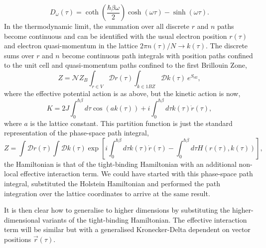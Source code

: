 \begin{equation} \label{eqn:phonongf}
    D_{\omega}(\tau) = \coth(\frac{\hbar\beta\omega}{2}) \cosh(\omega \tau) - \sinh(\omega\tau).
\end{equation}
In the thermodynamic limit, the summation over all discrete $r$ and $n$ paths become continuous and can be identified with the usual electron position $r(\tau)$ and electron quasi-momentum in the lattice $ 
2\pi n(\tau) / N \rightarrow k(\tau)$. The discrete sums over $r$ and $n$ become continuous path integrals with position paths confined to the unit cell and quasi-momentum paths confined to the first Brillouin Zone,
\begin{equation}
    Z = \mathcal{N} Z_B \int_{r \in V} \mathcal{D}r(\tau) \int_{k \in 1BZ} \mathcal{D} k(\tau)\ e^{S_{\text{eff}}} ,
\end{equation}
where the effective potential action is as above, but the kinetic action is now,
\begin{equation}
    K = 2 J \int_0^{\hbar\beta} d\tau \cos{(a k(\tau))} + i \int_0^{\hbar\beta} d\tau k(\tau) \Dot{r}(\tau) ,
\end{equation}
where $a$ is the lattice constant. This partition function is just the standard representation of the phase-space path integral,
\begin{equation}
    Z = \int \mathcal{D}r(\tau) \int \mathcal{D}k(\tau) \exp \left[i \int_0^{\hbar\beta} d\tau k(\tau) \Dot{r}(\tau) - \int_0^{\hbar\beta} d\tau H(r(\tau), k(\tau)) \right] ,
\end{equation}
the Hamiltonian is that of the tight-binding Hamiltonian with an additional non-local effective interaction term. We could have started with this phase-space path integral, substituted the Holstein Hamiltonian and performed the path integration over the lattice coordinates to arrive at the same result. 

It is then clear how to generalise to higher dimensions by substituting the higher-dimensional variants of the tight-binding Hamiltonian. The effective interaction term will be similar but with a generalised Kronecker-Delta dependent on vector positions $\Vec{r}(\tau)$.


